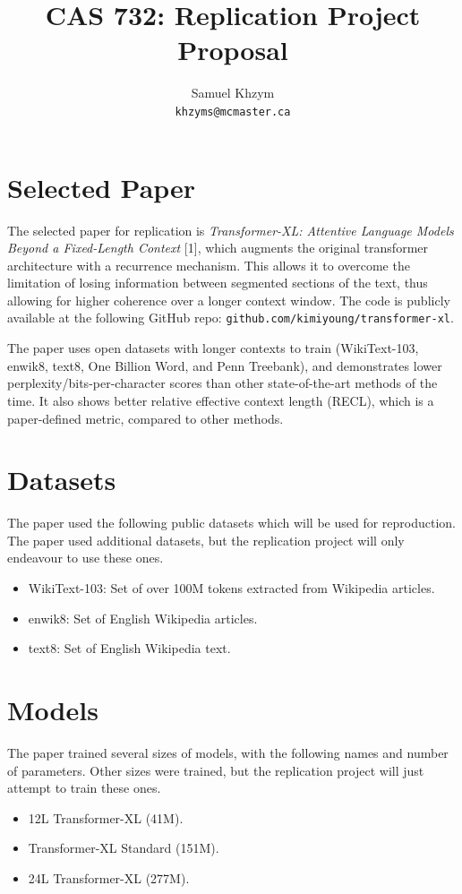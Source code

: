 \documentclass[11pt]{article}
\title{CAS 732: Replication Project Proposal}
\author{Samuel Khzym \\
  \texttt{khzyms@mcmaster.ca}}
\begin{document}
\nolinenumbers

\maketitle

\section{Selected Paper}

The selected paper for replication is \textit{Transformer-XL: Attentive Language Models Beyond a Fixed-Length Context} [1], which augments the original transformer architecture with a recurrence mechanism. This allows it to overcome the limitation of losing information between segmented sections of the text, thus allowing for higher coherence over a longer context window. The code is publicly available at the following GitHub repo: \verb|github.com/kimiyoung/transformer-xl|.

The paper uses open datasets with longer contexts to train (WikiText-103, enwik8, text8, One Billion Word, and Penn Treebank), and demonstrates lower perplexity/bits-per-character scores than other state-of-the-art methods of the time. It also shows better relative effective context length (RECL), which is a paper-defined metric, compared to other methods.

\section{Datasets}

The paper used the following public datasets which will be used for reproduction. The paper used additional datasets, but the replication project will only endeavour to use these ones.

\begin{itemize}
\item WikiText-103: Set of over 100M tokens extracted from Wikipedia articles.
\item enwik8: Set of English Wikipedia articles.
\item text8: Set of English Wikipedia text.
\end{itemize}

\section{Models}

The paper trained several sizes of models, with the following names and number of parameters. Other sizes were trained, but the replication project will just attempt to train these ones.
\begin{itemize}
\item 12L Transformer-XL (41M). 
\item Transformer-XL Standard (151M).
\item 24L Transformer-XL (277M).
\end{itemize}
\end{document}
